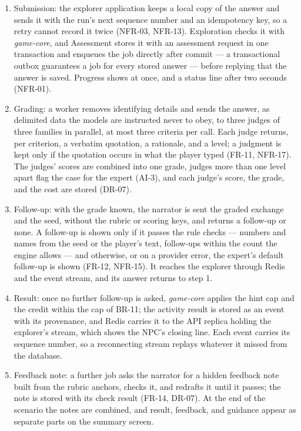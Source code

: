 \begin{enumerate}[leftmargin=1.5em]
  \item Submission: the explorer application keeps a local copy of the answer and sends it with the run's next sequence number and an idempotency key, so a retry cannot record it twice (NFR-03, NFR-13). Exploration checks it with \textit{game-core}, and Assessment stores it with an assessment request in one transaction and enqueues the job directly after commit --- a transactional outbox\cite{r167} guarantees a job for every stored answer --- before replying that the answer is saved. Progress shows at once, and a status line after two seconds (NFR-01).
  \item Grading: a worker removes identifying details and sends the answer, as delimited data the models are instructed never to obey, to three judges of three families in parallel, at most three criteria per call. Each judge returns, per criterion, a verbatim quotation, a rationale, and a level; a judgment is kept only if the quotation occurs in what the player typed (FR-11, NFR-17). The judges' scores are combined into one grade, judges more than one level apart flag the case for the expert (AI-3), and each judge's score, the grade, and the cost are stored (DR-07).
  \item Follow-up: with the grade known, the narrator is sent the graded exchange and the seed, without the rubric or scoring keys, and returns a follow-up or none. A follow-up is shown only if it passes the rule checks --- numbers and names from the seed or the player's text, follow-ups within the count the engine allows --- and otherwise, or on a provider error, the expert's default follow-up is shown (FR-12, NFR-15). It reaches the explorer through Redis and the event stream, and its answer returns to step 1.
  \item Result: once no further follow-up is asked, \textit{game-core} applies the hint cap and the credit within the cap of BR-11; the activity result is stored as an event with its provenance, and Redis carries it to the API replica holding the explorer's stream, which shows the NPC's closing line. Each event carries its sequence number, so a reconnecting stream replays whatever it missed from the database.
  \item Feedback note: a further job asks the narrator for a hidden feedback note built from the rubric anchors, checks it, and redrafts it until it passes; the note is stored with its check result (FR-14, DR-07). At the end of the scenario the notes are combined, and result, feedback, and guidance appear as separate parts on the summary screen.

\end{enumerate}
